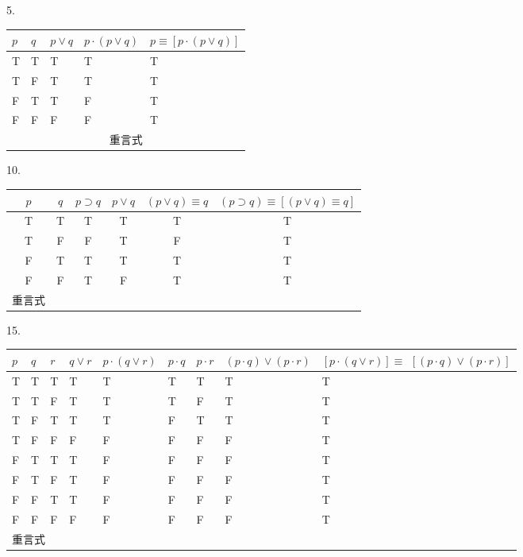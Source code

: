5.

\begin{center}
\begin{tabular}{|l|l|l|l|l|}
\hline
$p$ & $q$ & $p \vee q$ & $p \cdot(p \vee q)$ & $p \equiv[p \cdot(p \vee q)]$ \\
\hline
T & T & T & T & T \\
\hline
T & F & T & T & T \\
\hline
F & T & T & F & T \\
\hline
F & F & F & F & T \\
\hline
\multicolumn{5}{|c|}{重言式} \\
\hline
\end{tabular}
\end{center}

10.

\begin{center}
\begin{tabular}{|cccccc|}
\hline
$p$ & $q$ & $p \supset q$ & $p \vee q$ & $(p \vee q) \equiv q$ & $(p \supset q) \equiv[(p \vee q) \equiv q]$ \\
\hline
T & T & T & T & T & T \\
T & F & F & T & F & T \\
F & T & T & T & T & T \\
F & F & T & F & T & T \\
\hline
重言式 &  &  &  &  &  \\
\hline
\end{tabular}
\end{center}

15.

\begin{center}
\begin{tabular}{|l|l|l|l|l|l|l|l|l|}
\hline
$p$ & $q$ & $r$ & $q \vee r$ & $p \cdot(q \vee r)$ & $p \cdot q$ & $p \cdot r$ & $(p \cdot q) \vee(p \cdot r)$ & $[p \cdot(q \vee r)] \equiv$ $[(p \cdot q) \vee(p \cdot r)]$ \\
\hline
T & T & T & T & T & T & T & T & T \\
\hline
T & T & F & T & T & T & F & T & T \\
\hline
T & F & T & T & T & F & T & T & T \\
\hline
T & F & F & F & F & F & F & F & T \\
\hline
F & T & T & T & F & F & F & F & T \\
\hline
F & T & F & T & F & F & F & F & T \\
\hline
F & F & T & T & F & F & F & F & T \\
\hline
F & F & F & F & F & F & F & F & T \\
\hline
\multicolumn{9}{|l|}{重言式} \\
\hline
\end{tabular}
\end{center}

